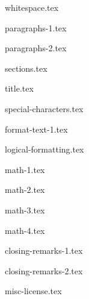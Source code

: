 \documentclass[allauthors]{../../cursuspresentatie}
\def\importslide#1#2{%
	{#2}
}
\begin{document}
\importslide{beginners}{whitespace.tex}

\importslide{beginners}{paragraphs-1.tex}
\importslide{beginners}{paragraphs-2.tex}



\importslide{beginners}{sections.tex}


\importslide{beginners}{title.tex}


\importslide{beginners}{special-characters.tex}

\importslide{beginners}{format-text-1.tex}

\importslide{beginners}{logical-formatting.tex}


\importslide{beginners}{math-1.tex}

\importslide{beginners}{math-2.tex}


\importslide{beginners}{math-3.tex}

\importslide{beginners}{math-4.tex}


\importslide{beginners}{closing-remarks-1.tex}
\importslide{beginners}{closing-remarks-2.tex}

	
\importslide{misc}{misc-license.tex}
\end{document}
